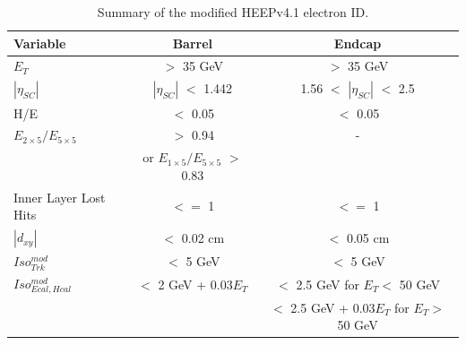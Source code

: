 \begin{table}
  \begin{center}
    \begin{tabular}{|l|c|c|}
      \hline
      Variable & Barrel & Endcap \\\hline
      $E_{T}$ & $>$ 35 GeV & $>$ 35 GeV \\
      $|\eta_{SC}|$ & $|\eta_{SC}|$ $<$ 1.442 & 1.56 $<$ $|\eta_{SC}|$ $<$ 2.5 \\
      H/E & $<$ 0.05 & $<$ 0.05 \\ 
      $E_{2\times5}/E_{5\times5}$ & $>$ 0.94 & - \\
      & or $E_{1\times5}/E_{5\times5}$ $>$ 0.83 & \\ 
      Inner Layer Lost Hits & $<=$ 1 & $<=$ 1 \\
      $|d_{xy}|$ & $<$ 0.02 cm & $<$ 0.05 cm\\
      \hline
      $Iso_{Trk}^{mod}$  & $<$ 5 GeV& $<$ 5 GeV\\
      \hline
      $Iso_{Ecal, Hcal}^{mod}$  & $<$ 2 GeV + 0.03$E_{T}$ & $<$ 2.5 GeV for $E_{T} <$ 50 GeV \\
      & & $<$ 2.5 GeV + 0.03$E_{T}$ for $E_{T} >$ 50 GeV \\
      \hline
    \end{tabular}
    \caption{\label{tab:EleIDtable} Summary of the modified HEEPv4.1 electron ID.}
  \end{center}
\end{table}

\newpage

